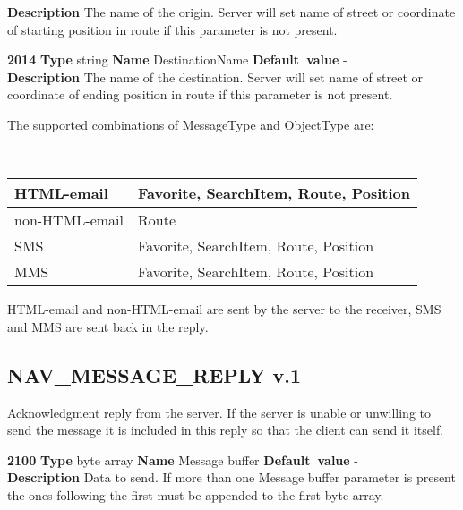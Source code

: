\documentclass[a4paper]{article}
\begin{document}
\begin{list}{\textbf{ParamID}}{}
  \label{OriginName}
  \textbf{Description} The name of the origin. Server will set name of street
  or coordinate of starting position in route if this parameter is not 
  present.
\item \textbf{2014} \textbf{Type} string \textbf{Name} DestinationName
                 \textbf{Default~value} - \\
  \label{DestinationName}
  \textbf{Description} The name of the destination. Server will set name of
  street or coordinate of ending position in route if this parameter is not 
  present.
\end{list}

The supported combinations of MessageType and ObjectType are:

~

\begin{tabular}{|l|p{7cm}|} \hline
HTML-email & Favorite, SearchItem, Route, Position                    \\\hline
non-HTML-email & Route                                                \\\hline
SMS & Favorite, SearchItem, Route, Position                           \\\hline
MMS& Favorite, SearchItem, Route, Position                            \\\hline
\end{tabular}

HTML-email and non-HTML-email are sent by the server to the receiver, SMS
and MMS are sent back in the reply.

\subsection{NAV\_MESSAGE\_REPLY v.1}

Acknowledgment reply from the server. If the server is unable or
unwilling to send the message it is included in this reply so that the
client can send it itself.

\begin{list}{\textbf{ParamID}}{}
\item \textbf{2100} \textbf{Type} byte array \textbf{Name} Message buffer
                 \textbf{Default~value} - \\
  \label{Message buffer}
  \textbf{Description} Data to send. If more than one
  Message buffer parameter is present the ones following the first must be
  appended to the first byte array.
\end{list}
\end{document}
